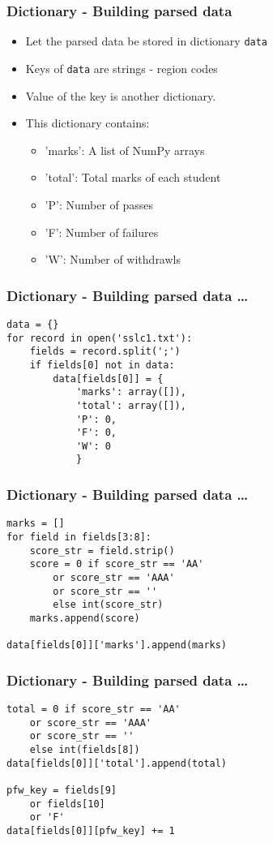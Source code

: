 \documentclass[14pt,compress]{beamer}
\newcommand{\typ}[1]{\lstinline{#1}}
\begin{document}
\begin{frame}[fragile]
  \frametitle{Dictionary - Building parsed data}
  \begin{itemize}
    \item Let the parsed data be stored in dictionary \typ{data}
    \item Keys of \typ{data} are strings - region codes
    \item Value of the key is another dictionary.
    \item This dictionary contains:
    \begin{itemize}
      \item 'marks': A list of NumPy arrays
      \item 'total': Total marks of each student
      \item 'P': Number of passes
      \item 'F': Number of failures
      \item 'W': Number of withdrawls
    \end{itemize}
  \end{itemize}
\end{frame}

\begin{frame}[fragile]
  \frametitle{Dictionary - Building parsed data \ldots}
  \small
  \begin{lstlisting}
data = {}
for record in open('sslc1.txt'):
    fields = record.split(';')
    if fields[0] not in data:
        data[fields[0]] = {
            'marks': array([]),
            'total': array([]),
            'P': 0,
            'F': 0,
            'W': 0
            }
  \end{lstlisting}
\end{frame}

\begin{frame}[fragile]
  \frametitle{Dictionary - Building parsed data \ldots}
  \begin{lstlisting}
marks = []
for field in fields[3:8]:
    score_str = field.strip()
    score = 0 if score_str == 'AA'
        or score_str == 'AAA'
        or score_str == ''
        else int(score_str)
    marks.append(score)

data[fields[0]]['marks'].append(marks)
  \end{lstlisting}
\end{frame}

\begin{frame}[fragile]
  \frametitle{Dictionary - Building parsed data \ldots}
  \begin{lstlisting}
total = 0 if score_str == 'AA'
    or score_str == 'AAA'
    or score_str == ''
    else int(fields[8])
data[fields[0]]['total'].append(total)

pfw_key = fields[9]
    or fields[10]
    or 'F'
data[fields[0]][pfw_key] += 1
  \end{lstlisting}
\end{frame}
\end{document}
